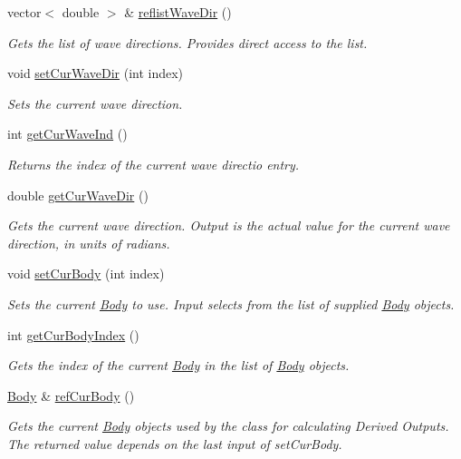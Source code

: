 \begin{DoxyCompactItemize}
vector$<$ double $>$ \& \hyperlink{class_outputs_body_a76439db0a461f51b572c0d011cf405b7}{reflist\-Wave\-Dir} ()
\begin{DoxyCompactList}\small\item\em Gets the list of wave directions. Provides direct access to the list. \end{DoxyCompactList}\item 
void \hyperlink{class_outputs_body_a7d2b93ecaf1fa39257444bdf3194eacc}{set\-Cur\-Wave\-Dir} (int index)
\begin{DoxyCompactList}\small\item\em Sets the current wave direction. \end{DoxyCompactList}\item 
int \hyperlink{class_outputs_body_acac6b220f8d472d3cc7e9102022c88ff}{get\-Cur\-Wave\-Ind} ()
\begin{DoxyCompactList}\small\item\em Returns the index of the current wave directio entry. \end{DoxyCompactList}\item 
double \hyperlink{class_outputs_body_a21deeef0aaace27fa376c6222bc8b0a4}{get\-Cur\-Wave\-Dir} ()
\begin{DoxyCompactList}\small\item\em Gets the current wave direction. Output is the actual value for the current wave direction, in units of radians. \end{DoxyCompactList}\item 
void \hyperlink{class_outputs_body_a4b33361c2888937d2aa450f3e6df200d}{set\-Cur\-Body} (int index)
\begin{DoxyCompactList}\small\item\em Sets the current \hyperlink{class_body}{Body} to use. Input selects from the list of supplied \hyperlink{class_body}{Body} objects. \end{DoxyCompactList}\item 
int \hyperlink{class_outputs_body_a7331d48ef7cee6bd23ac0ab487894d6c}{get\-Cur\-Body\-Index} ()
\begin{DoxyCompactList}\small\item\em Gets the index of the current \hyperlink{class_body}{Body} in the list of \hyperlink{class_body}{Body} objects. \end{DoxyCompactList}\item 
\hyperlink{class_body}{Body} \& \hyperlink{class_outputs_body_afdb3f49b84baf1a6b2de8a5d014abfe5}{ref\-Cur\-Body} ()
\begin{DoxyCompactList}\small\item\em Gets the current \hyperlink{class_body}{Body} objects used by the class for calculating Derived Outputs. The returned value depends on the last input of set\-Cur\-Body. \end{DoxyCompactList}\item 

\end{DoxyCompactItemize}
